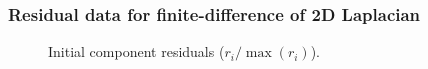 \documentclass{beamer}
\begin{document}
\begin{frame}
	\frametitle{Residual data for finite-difference of 2D Laplacian}
	\begin{figure}[H]
		\centering
		\caption{Initial component residuals ($r_i / \max (r_i)$).}
		\label{fig:initial-residuals-laplacian}
	\end{figure}
\end{frame}
\end{document}
